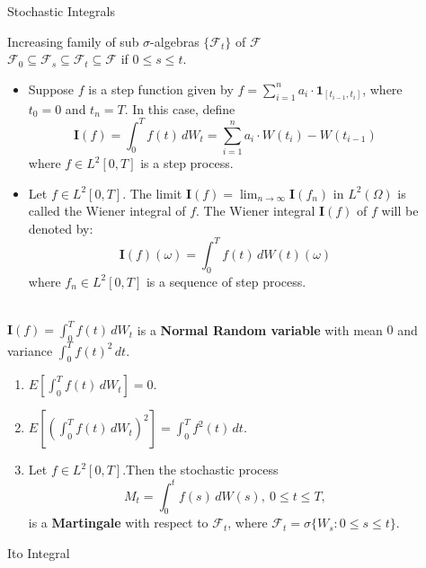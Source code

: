 \documentclass[final]{beamer}
\newlength{\sepwidth}
\newlength{\colwidth}
\newcommand{\separatorcolumn}{\begin{column}{\sepwidth}\end{column}}
\begin{document}
\begin{frame}[t]
\begin{columns}[t]
\begin{column}{\colwidth}
\end{column}

\separatorcolumn

\begin{column}{\colwidth}

  \begin{block}{Stochastic Integrals}
  
   Increasing family of sub $\sigma$-algebras $\{\mathcal{F}_t\}$ of $\mathcal{F}$\\
       $\mathcal{F}_0  \subseteq \mathcal{F}_s  \subseteq \mathcal{F}_t  \subseteq \mathcal{F}$ if $0 \leq s \leq t$.
   \\
        \begin{itemize}
        \item Suppose $f$ is a step function given by $f = \sum_{i=1}^n a_i \cdot \mathbf{1}_{[t_{i-1}, t_i]}$, where $t_0 = 0$ and $t_n = T$. In this case, define 
        \[\mathbf{I}(f) = \int_0^{T}{f(t)\,dW_t} = \sum_{i=1}^n a_i \cdot W(t_i) - W(t_{i-1})\]
        where $f \in L^2[0,T]$ is a step process.

            \item Let $f \in L^2[0,T]$. The limit $\mathbf{I}(f) = \lim_{n \to \infty} \mathbf{I}(f_n)$ in $L^2(\Omega)$ is called the Wiener integral of $f$. The Wiener integral $\mathbf{I}(f)$ of $f$ will be denoted by:
\[ \mathbf{I}(f)(\omega) = \int_{0}^{T} f(t) \, dW(t)(\omega) \]
 where $f_n \in L^2[0,T]$ is a sequence of step process.
        \end{itemize}
        
        
          \\
         $\mathbf{I}(f) = \int_0^T f(t)\,dW_t$ is a \textbf{Normal Random variable} with mean $0$ and variance $\int_0^T f(t)^{2}\,dt$.
\begin{enumerate}
    \item $E[\int_0^T f(t)\,dW_t] = 0$.
    \item $E[(\int_0^T f(t)\,dW_t)^{2}] = \int_0^T f^{2}(t)\,dt$.
    \item Let $f \in L^2[0,T]$.Then the stochastic process \[ M_t = \int_0^t f(s)\,dW(s),\ 0 \leq t \leq T,\] is a \textbf{Martingale} with respect to $\mathcal{F}_t$, where $\mathcal{F}_t = \sigma\{W_s:0\leq s\leq t\}$.
\end{enumerate}
  \end{block}

  \begin{block}{It$\hat{\text{o}}$ Integral}


\end{block}
\end{column}
\end{columns}
\end{frame}
\end{document}
